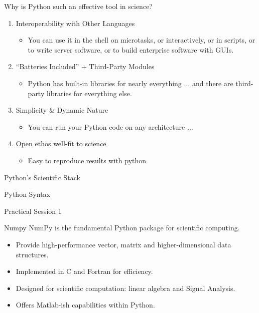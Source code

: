 \documentclass{bredelebeamer}
\begin{document}
\begin{frame}{Why is Python such an effective tool in
science?}
\begin{enumerate}
	\item Interoperability with Other Languages
	\begin{itemize}
		\item You can use it in the shell on microtasks, or interactively, or in scripts, or to write server software, or to build enterprise software with GUIs.
	\end{itemize}	
	\item “Batteries Included” + Third-Party Modules
	\begin{itemize}
		\item Python has built-in libraries for nearly everything $\ldots$ and there are third-party
libraries for everything else.
	\end{itemize}	
	\item Simplicity \& Dynamic Nature
	\begin{itemize}
		\item  You can run your Python code on any architecture $\ldots$
	\end{itemize}	
	\item Open ethos well-fit to science
	\begin{itemize}
		\item Easy to reproduce results with python
	\end{itemize}	
\end{enumerate}	
\end{frame}


\begin{frame}{Python’s Scientific Stack}

\end{frame}	
  

\begin{frame}{Python Syntax}

\centering
{\LARGE
    Practical Session 1
}
\end{frame}

\begin{frame}{Numpy}
NumPy is the fundamental Python package for scientific computing.
\begin{itemize}
	\item Provide high-performance vector, matrix and higher-dimensional data structures.
	\item Implemented in C and Fortran for efficiency.
	\item Designed for scientific computation: linear algebra and Signal Analysis.
	\item Offers Matlab-ish capabilities within Python.
\end{itemize}	

\end{frame}	
\end{document}
